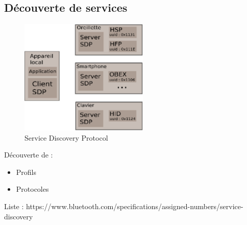 \begin{frame}
\subsection{Découverte de services}
\begin{minipage}[t]{0.70\linewidth}

\begin{figure}
\includegraphics[height=5.5cm]{sdp.png}
\caption{Service Discovery Protocol}
\end{figure}


\end{minipage}
\begin{minipage}[t]{0.27\linewidth}
\begin{block}{Découverte de :}
\begin{itemize}
\item Profils
\item Protocoles
\end{itemize}
\end{block}

\end{minipage}
{\tiny Liste : https://www.bluetooth.com/specifications/assigned-numbers/service-discovery}
\end{frame}
